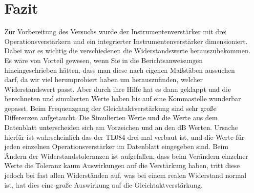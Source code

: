 \chapter{Fazit}
Zur Vorbereitung des Versuchs wurde der Instrumentenverstärker mit drei Operationsverstärkern und ein integrierter Instrumentenverstärker dimensioniert. Dabei war es wichtig die verschiedenen die Widerstandswerte herauszubekommen. Es wäre von Vorteil gewesen, wenn Sie in die Berichtsanweisungen hineingeschrieben hätten, dass man diese nach eigenen Maßstäben aussuchen darf, da wir viel herumprobiert haben um herauszufinden, welcher Widerstandswert passt. Aber durch ihre Hilfe hat es dann geklappt und die berechneten und simulierten Werte haben bis auf eine Kommastelle wunderbar gepasst. Beim Frequenzgang der Gleichtaktverstärkung sind sehr große Differenzen aufgetaucht. Die Simulierten Werte und die Werte aus dem Datenblatt unterscheiden sich am Vorzeichen und an den dB Werten. Ursache hierfür ist wahrscheinlich das der TL084 drei mal verbaut ist, und die Werte für jeden einzelnen Operationsverstärker im Datenblatt eingegeben sind. Beim Ändern der Widerstandstoleranzen ist aufgefallen, dass beim Verändern einzelner Werte die Toleranz kaum Auswirkungen auf die Verstärkung haben, tritt diese jedoch bei fast allen Widerständen auf, was bei einem realen Widerstand normal ist, hat dies eine große Auswirkung auf die Gleichtaktverstärkung.